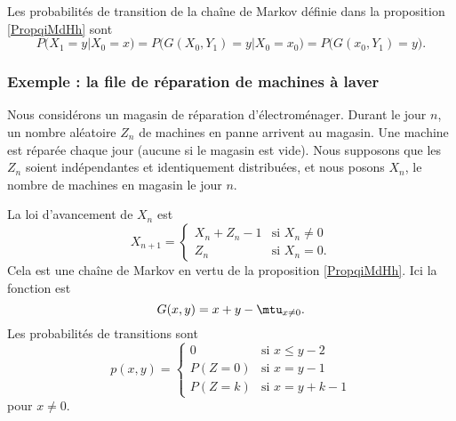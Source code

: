 Les probabilités de transition de la chaîne de Markov définie dans la proposition \ref{PropqiMdHh} sont
\begin{equation}
    P(X_1=y|X_0=x)=P\big( G(X_0,Y_1)=y|X_0=x_0 \big)=P\big( G(x_0,Y_1)=y \big).
\end{equation}

\subsubsection{Exemple : la file de réparation de machines à laver}

Nous considérons un magasin de réparation d'électroménager. Durant le jour \( n\), un nombre aléatoire \( Z_{n}\) de machines en panne arrivent au magasin. Une machine est réparée chaque jour (aucune si le magasin est vide). Nous supposons que les \( Z_n\) soient indépendantes et identiquement distribuées, et nous posons \( X_n\), le nombre de machines en magasin le jour \( n\).

La loi d'avancement de \( X_n\) est
\begin{equation}
    X_{n+1}=\begin{cases}
        X_n+Z_n-1    &   \text{si } X_n\neq 0\\
        Z_n    &    \text{si } X_n=0.
    \end{cases}
\end{equation}
Cela est une chaîne de Markov en vertu de la proposition \ref{PropqiMdHh}. Ici la fonction est
\begin{equation}
    G(x,y)=x+y-\mtu_{x\neq 0}.
\end{equation}
Les probabilités de transitions sont 
\begin{equation}
    p(x,y)=\begin{cases}
        0    &   \text{si } x\leq y-2\\
        P(Z=0)    &    \text{si } x=y-1\\
        P(Z=k)&\text{si } x=y+k-1
    \end{cases}
\end{equation}
pour \( x\neq 0\).



